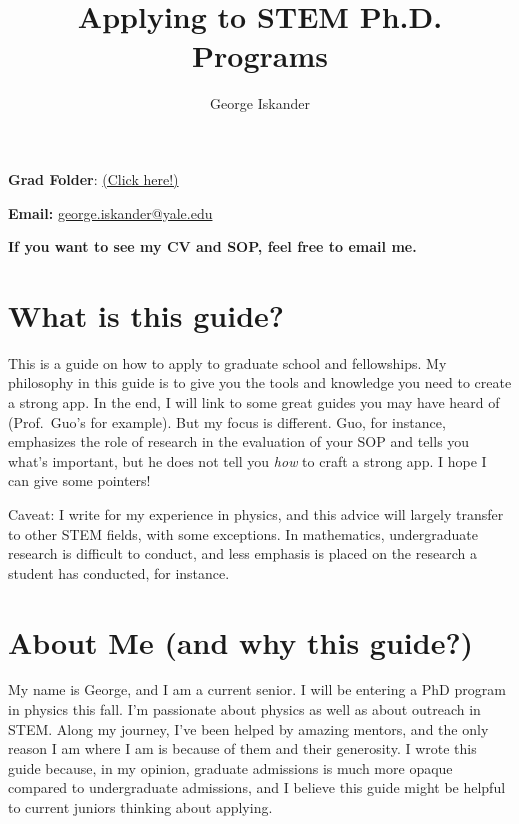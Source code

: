 \documentclass[12pt]{article}
\begin{document}
\title{\vspace{-2em}Applying to STEM Ph.D. Programs}
\author{George Iskander}
\date{}
\maketitle
\vspace*{-2em}


\textbf{Grad Folder}: \href{https://drive.google.com/drive/folders/1vI2JCuJCNmggk-SFkw5LnA046zGItzvM?usp=sharing}{(Click here!)}

\textbf{Email:} \href{mailto:george.iskander@yale.edu}{george.iskander@yale.edu}

\textbf{If you want to see my CV and SOP, feel free to email me.}
\tableofcontents
\newpage


\section{What is this guide?}
This is a guide on how to apply to graduate school and fellowships. My philosophy in this guide is to give you the tools and knowledge you need to create a strong app. In the end, I will link to some great guides you may have heard of (Prof.\ Guo's for example). But my focus is different. Guo, for instance, emphasizes the role of research in the evaluation of your SOP and tells you what's important, but he does not tell you \textit{how} to craft a strong app. I hope I can give some pointers!

Caveat: I write for my experience in physics, and this advice will largely transfer to other STEM fields, with some exceptions. In mathematics, undergraduate research is difficult to conduct, and less emphasis is placed on the research a student has conducted, for instance.

\section{About Me (and why this guide?)}
My name is George, and I am a current senior. I will be entering a PhD program in physics this fall. I'm passionate about physics as well as about outreach in STEM. Along my journey, I've been helped by amazing mentors, and the only reason I am where I am is because of them and their generosity. I wrote this guide because, in my opinion, graduate admissions is much more opaque compared to undergraduate admissions, and I believe this guide might be helpful to current juniors thinking about applying.
\end{document}
